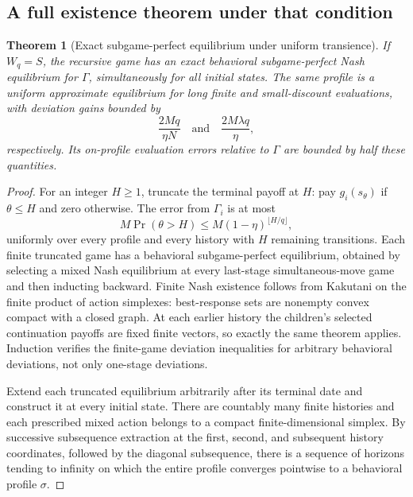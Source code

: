 \documentclass[11pt,a4paper]{article}
\newtheorem{theorem}{Theorem}[section]
\theoremstyle{definition}
\theoremstyle{remark}
\begin{document}
\subsection{A full existence theorem under that condition}
\begin{theorem}[Exact subgame-perfect equilibrium under uniform transience]
If $W_q=S$, the recursive game has an exact behavioral subgame-perfect Nash equilibrium for $\Gamma$, simultaneously for all initial states. The same profile is a uniform approximate equilibrium for long finite and small-discount evaluations, with deviation gains bounded by
\[
 \frac{2Mq}{\eta N}\quad\text{and}\quad \frac{2M\lambda q}{\eta},
\]
respectively. Its on-profile evaluation errors relative to $\Gamma$ are bounded by half these quantities.
\end{theorem}
\begin{proof}
For an integer $H\geq1$, truncate the terminal payoff at $H$: pay $g_i(s_\theta)$ if $\theta\leq H$ and zero otherwise. The error from $\Gamma_i$ is at most
\[
 M\Pr(\theta>H)\leq M(1-\eta)^{\lfloor H/q\rfloor},
\]
uniformly over every profile and every history with $H$ remaining transitions. Each finite truncated game has a behavioral subgame-perfect equilibrium, obtained by selecting a mixed Nash equilibrium at every last-stage simultaneous-move game and then inducting backward. Finite Nash existence follows from Kakutani on the finite product of action simplexes: best-response sets are nonempty convex compact with a closed graph. At each earlier history the children's selected continuation payoffs are fixed finite vectors, so exactly the same theorem applies. Induction verifies the finite-game deviation inequalities for arbitrary behavioral deviations, not only one-stage deviations.

Extend each truncated equilibrium arbitrarily after its terminal date and construct it at every initial state. There are countably many finite histories and each prescribed mixed action belongs to a compact finite-dimensional simplex. By successive subsequence extraction at the first, second, and subsequent history coordinates, followed by the diagonal subsequence, there is a sequence of horizons tending to infinity on which the entire profile converges pointwise to a behavioral profile $\sigma$.


\end{proof}
\end{document}
